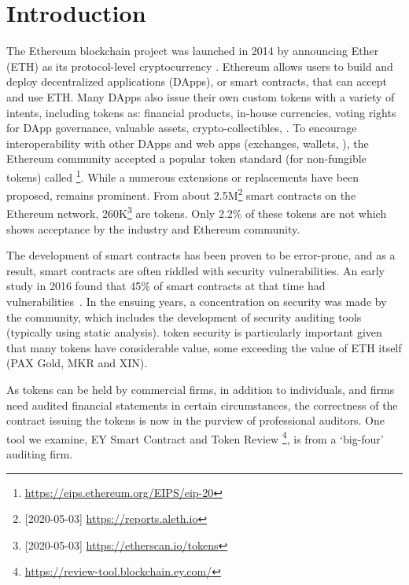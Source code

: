 
\section{Introduction}
\label{sect:introduction}

The Ethereum blockchain project was launched in 2014 by announcing Ether (ETH) as its protocol-level cryptocurrency \cite{EthGit,EIP150}. Ethereum allows users to build and deploy decentralized applications (DApps), or smart contracts, that can accept and use ETH. Many DApps also issue their own custom tokens with a variety of intents, including tokens as: financial products, in-house currencies, voting rights for DApp governance, valuable assets, crypto-collectibles, \etc. To encourage interoperability with other DApps and web apps (exchanges, wallets, \etc), the Ethereum community accepted a popular token standard (for non-fungible tokens) called \erc\footnote{\url{https://eips.ethereum.org/EIPS/eip-20}}. While a numerous \erc extensions or replacements have been proposed, \erc remains prominent. From about 2.5M\footnote{[2020-05-03] \url{https://reports.aleth.io}} smart contracts on the Ethereum network, 260K\footnote{[2020-05-03] \url{https://etherscan.io/tokens}} are tokens. {\chg Only 2.2\% of these tokens are not \erc\cite{EtherScan} which shows \erc acceptance by the industry and Ethereum community.}

The development of smart contracts has been proven to be error-prone, and as a result, smart contracts are often riddled with security vulnerabilities. An early study in 2016 found that 45\% of smart contracts at that time had vulnerabilities~\cite{MakSm}. In the ensuing years, a concentration on security was made by the community, which includes the development of security auditing tools (typically using static analysis). \erc token security is particularly important given that many tokens have considerable value, some exceeding the value of ETH itself (\eg PAX Gold, MKR and XIN). 

As tokens can be held by commercial firms, in addition to individuals, and firms need audited financial statements in certain circumstances, the correctness of the contract issuing the tokens is now in the purview of professional auditors. One tool we examine, EY {\chg Smart Contract and Token Review \footnote{\url{https://review-tool.blockchain.ey.com/}}}, is from a `big-four' auditing firm. 

